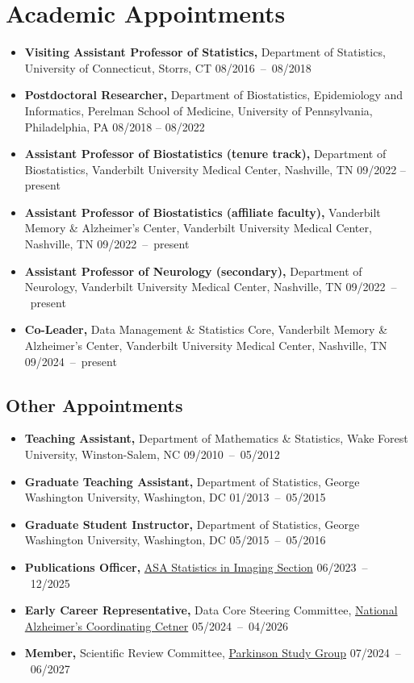 \documentclass[12pt]{article}
\begin{document}
	\section*{Academic Appointments}
	\begin{itemize}
		\item {\bf Visiting Assistant Professor of Statistics,} 
		Department of Statistics, University of Connecticut, Storrs, 
		CT \hfill \mbox{08/2016 -- 08/2018} 
		\item {\bf Postdoctoral Researcher,} Department of 
		Biostatistics, Epidemiology and Informatics, Perelman School of Medicine, University of Pennsylvania, Philadelphia, PA \hfill 08/2018 -- 08/2022
		\item {\bf Assistant Professor of Biostatistics (tenure track),} Department of Biostatistics, Vanderbilt University Medical Center, Nashville, TN \hfill 09/2022 -- present
		\item {\bf Assistant Professor of Biostatistics (affiliate 
		faculty),} Vanderbilt Memory \& Alzheimer's Center, 
		Vanderbilt University Medical Center, Nashville, TN \hfill 
		\mbox{09/2022 -- present}
		\item {\bf Assistant Professor of Neurology (secondary),} 
		Department of Neurology, Vanderbilt University Medical 
		Center, Nashville, TN \hfill \mbox{09/2022 -- present}
		\item {\bf Co-Leader,} Data Management \& Statistics 
		Core, Vanderbilt Memory \& Alzheimer's Center, Vanderbilt 
		University Medical Center, Nashville, TN \hfill \mbox{09/2024 
		-- present}
	\end{itemize}

	\subsection*{Other Appointments}
	\begin{itemize}
		\item {\bf Teaching Assistant,} Department of Mathematics \& Statistics, Wake Forest University, Winston-Salem, NC \hfill \mbox{09/2010 -- 05/2012}
		\item {\bf Graduate Teaching Assistant,} Department of 
		Statistics, George Washington University, Washington, DC 
		\hfill \mbox{01/2013 -- 05/2015}
		\item {\bf Graduate Student Instructor,} Department of 
		Statistics, George Washington University, Washington, DC 
		\hfill \mbox{05/2015 -- 05/2016}
		\item {\bf Publications Officer,} 
		\href{https://www.statsinimaging.org/}{ASA Statistics in 
		Imaging Section}
		\hfill \mbox{06/2023 -- 12/2025}
		\item {\bf Early Career Representative,} Data Core Steering 
		Committee, \href{https://naccdata.org/}{National Alzheimer's 
		Coordinating Cetner} \hfill \mbox{05/2024 -- 04/2026}
		\item {\bf Member,} Scientific Review Committee, 
		\href{https://parkinson-study-group.org/}{Parkinson Study 
		Group} \hfill \mbox{07/2024 -- 06/2027}
	\end{itemize}
\end{document}
